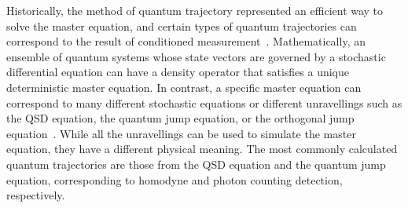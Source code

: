 \documentclass[12pt]{wlscirep}
\begin{document}
Historically, the method of quantum trajectory represented an efficient 
way to solve the master equation, and certain types of quantum trajectories 
can correspond to the result of conditioned 
measurement~\cite{CSBSMRH:2016,GKGBDHBRH:2007,YZSWDCWH:2008,VLMZFBA:2010,
NBSRFHWJ:2010,VSS:2011,MWMS:2013,HSMSGBSAFG:2013,VPSAWBGSHC:2014,FMDS:2014,
WCDJMS:2014,LRTETJWSD:2014}. Mathematically, an ensemble of quantum systems
whose state vectors are governed by a stochastic differential equation can 
have a density operator that satisfies a unique deterministic master equation.
In contrast, a specific master equation can correspond to many different 
stochastic equations or different unravellings such as the QSD equation, 
the quantum jump equation, or the orthogonal jump equation~\cite{P:book}.
While all the unravellings can be used to simulate the master equation, 
they have a different physical meaning. The most commonly calculated quantum 
trajectories are those from the QSD equation and the quantum jump equation, 
corresponding to homodyne and photon counting detection, respectively.
\end{document}
